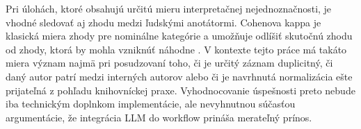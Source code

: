 Pri úlohách, ktoré obsahujú určitú mieru interpretačnej nejednoznačnosti, je vhodné sledovať aj zhodu medzi ľudskými anotátormi. Cohenova kappa je klasická miera zhody pre nominálne kategórie a umožňuje odlíšiť skutočnú zhodu od zhody, ktorá by mohla vzniknúť náhodne \cite{Cohen1960}. V kontexte tejto práce má takáto miera význam najmä pri posudzovaní toho, či je určitý záznam duplicitný, či daný autor patrí medzi interných autorov alebo či je navrhnutá normalizácia ešte prijateľná z pohľadu knihovníckej praxe. Vyhodnocovanie úspešnosti preto nebude iba technickým doplnkom implementácie, ale nevyhnutnou súčasťou argumentácie, že integrácia LLM do workflow prináša merateľný prínos.

